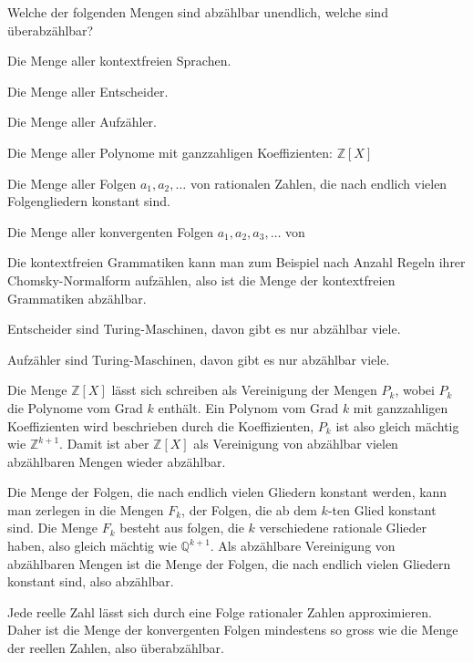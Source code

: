 Welche der folgenden Mengen sind abzählbar unendlich, welche sind
überabzählbar?
\begin{teilaufgaben}
\item
Die Menge aller kontextfreien Sprachen.
\item
Die Menge aller Entscheider.
\item
Die Menge aller Aufzähler.
\item
Die Menge aller Polynome mit ganzzahligen Koeffizienten:
${\mathbb Z}[X]$
\item
Die Menge aller Folgen $a_1,a_2,\dots$ von rationalen Zahlen,
die nach endlich vielen Folgengliedern konstant sind.
\item Die Menge aller konvergenten Folgen $a_1,a_2,a_3,\dots$ von
\end{teilaufgaben}


\begin{loesung}
\begin{teilaufgaben}
\item
Die kontextfreien Grammatiken kann man zum Beispiel nach
Anzahl Regeln ihrer Chomsky-Normalform aufzählen, also ist
die Menge der kontextfreien Grammatiken abzählbar.
\item
Entscheider sind Turing-Maschinen, davon gibt es nur abzählbar viele.
\item
Aufzähler sind Turing-Maschinen, davon gibt es nur abzählbar viele.
\item
Die Menge ${\mathbb Z}[X]$ lässt sich schreiben als Vereinigung
der Mengen $P_k$, wobei $P_k$ die Polynome vom Grad $k$ enthält.
Ein Polynom vom Grad $k$ mit ganzzahligen Koeffizienten wird beschrieben
durch die Koeffizienten, $P_k$ ist also gleich mächtig wie $\mathbb Z^{k+1}$.
Damit ist aber ${\mathbb Z}[X]$ als Vereinigung von abzählbar vielen
abzählbaren Mengen wieder abzählbar.
\item
Die Menge der Folgen, die nach endlich vielen Gliedern konstant
werden, kann man zerlegen in die Mengen $F_k$, der Folgen, die ab dem
$k$-ten Glied konstant sind. Die Menge $F_k$ besteht aus folgen, die
$k$ verschiedene rationale Glieder haben, also gleich mächtig wie
$\mathbb Q^{k+1}$. Als abzählbare Vereinigung von abzählbaren Mengen
ist die Menge der Folgen, die nach endlich vielen Gliedern konstant sind,
also abzählbar.
\item
Jede reelle Zahl lässt sich durch eine Folge rationaler Zahlen
approximieren. Daher ist die Menge der konvergenten Folgen mindestens
so gross wie die Menge der reellen Zahlen, also überabzählbar.
\qedhere
\end{teilaufgaben}
\end{loesung}

